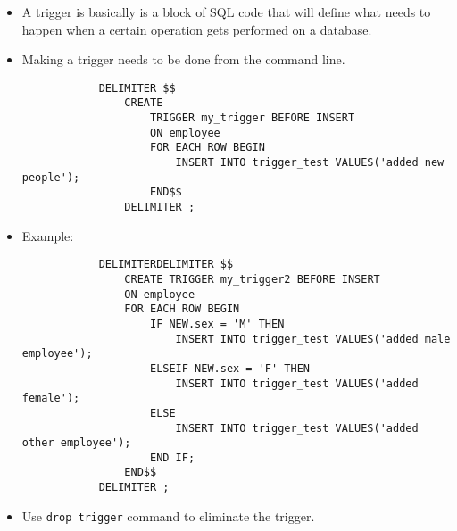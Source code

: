 \begin{itemize}
    \item A trigger is basically is a block of SQL code that will define what needs to happen when a certain operation gets performed on a database.
    
    \item Making a trigger needs to be done from the command line.
        \begin{verbatim}
            DELIMITER $$ 
                CREATE 
                    TRIGGER my_trigger BEFORE INSERT 
                    ON employee
                    FOR EACH ROW BEGIN 
                        INSERT INTO trigger_test VALUES('added new people');
                    END$$
                DELIMITER ;
        \end{verbatim}
    
    \item Example:
        \begin{verbatim}
            DELIMITERDELIMITER $$ 
                CREATE TRIGGER my_trigger2 BEFORE INSERT 
                ON employee 
                FOR EACH ROW BEGIN 
                    IF NEW.sex = 'M' THEN 
                        INSERT INTO trigger_test VALUES('added male employee');
                    ELSEIF NEW.sex = 'F' THEN 
                        INSERT INTO trigger_test VALUES('added female');
                    ELSE 
                        INSERT INTO trigger_test VALUES('added other employee');
                    END IF;
                END$$
            DELIMITER ;
        \end{verbatim}
    
    \item Use \texttt{drop trigger} command to eliminate the trigger.
\end{itemize}
